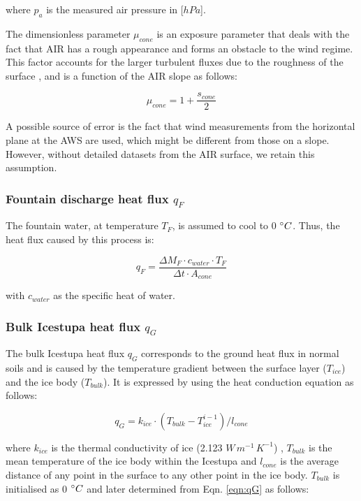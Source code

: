 \documentclass[utf8]{frontiersSCNS}
\begin{document}
where $p_{a}$ is the measured air pressure in [$hPa$].

The dimensionless parameter $\mu_{cone}$ is an exposure parameter that deals with the fact that AIR has a rough
appearance and forms an obstacle to the wind regime. This factor accounts for the larger turbulent fluxes due to
the roughness of the surface \citep{Oerlemans_2021}, and is a function of the AIR slope as follows:

\begin{equation}
	\mu_{cone} = 1 + \frac{s_{cone}}{2}
\end{equation}

A possible source of error is the fact that wind measurements from the horizontal plane at the AWS are used,
which might be different from those on a slope. However, without detailed datasets from the AIR surface, we
retain this assumption.

\subsubsection{Fountain discharge heat flux \texorpdfstring{$q_{F}$}{Lg} }

The fountain water, at temperature $T_F$, is assumed to cool to 0 $\degree C$. Thus, the heat flux caused by this
process is:

\begin{equation}
	q_{F} = \frac{ \Delta M_F \cdot c_{water} \cdot T_F}{\Delta t \cdot A_{cone}}
	\label{eqn:qF}
\end{equation}

with $c_{water}$ as the specific heat of water.

\subsubsection{Bulk Icestupa heat flux \texorpdfstring{$q_{G}$}{Lg}} \label{sec:Bulkflux}

The bulk Icestupa heat flux $q_{G}$ corresponds to the ground heat flux in normal soils and is caused by the
temperature gradient between the surface layer ($T_{ice}$) and the ice body ($T_{bulk}$). It is expressed by
using the heat conduction equation as follows:

\begin{equation} q_{G} = k_{ice} \cdot (T_{bulk}-T_{ice}^{i-1})/l_{cone} \label{eqn:qG}    \end{equation}

where $k_{ice}$ is the thermal conductivity of ice (2.123 $W\, m^{-1}\,K^{-1}$) , $T_{bulk}$ is the mean
temperature of the ice body within the Icestupa and $l_{cone}$ is the average distance of any point in the
surface to any other point in the ice body. $T_{bulk}$ is initialised as 0 $\degree C$ and later determined from
Eqn. \ref{eqn:qG} as follows:
\end{document}
